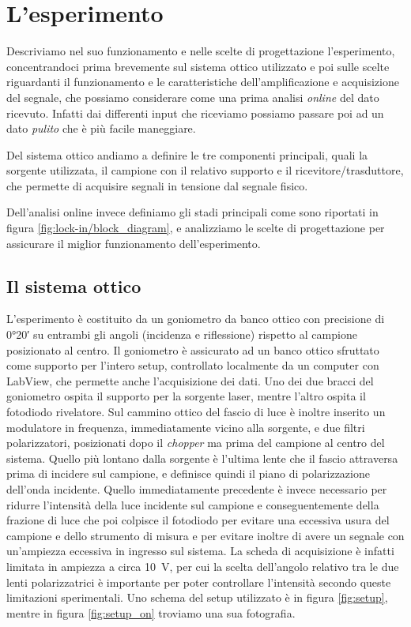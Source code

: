 \documentclass[
    prb,altaffilletter,citeautoscript,
    amsmath,amssymb,
    showpacs,showkeys,floatfix,
    reprint
]{revtex4-1}
\begin{document}
\section{L'esperimento}

Descriviamo nel suo funzionamento e nelle scelte di progettazione l'esperimento, concentrandoci prima brevemente sul sistema ottico utilizzato e poi sulle scelte riguardanti il funzionamento e le caratteristiche dell'amplificazione e acquisizione del segnale, che possiamo considerare come una prima analisi \emph{online} del dato ricevuto. Infatti dai differenti input che riceviamo possiamo passare poi ad un dato \emph{pulito} che è più facile maneggiare. 

Del sistema ottico andiamo a definire le tre componenti principali, quali la sorgente utilizzata, il campione con il relativo supporto e il ricevitore/trasduttore, che permette di acquisire segnali in tensione dal segnale fisico. 

Dell'analisi online invece definiamo gli stadi principali come sono riportati in figura \ref{fig:lock-in/block_diagram}, e analizziamo le scelte di progettazione per assicurare il miglior funzionamento dell'esperimento. 

\subsection{Il sistema ottico}

L'esperimento è costituito da un goniometro da banco ottico con precisione di \ang{0;20} su entrambi gli angoli (incidenza e riflessione) rispetto al campione posizionato al centro. Il goniometro è assicurato ad un banco ottico sfruttato come supporto per l'intero setup, controllato localmente da un computer con LabView, che permette anche l'acquisizione dei dati. Uno dei due bracci del goniometro ospita il supporto per la sorgente laser, mentre l'altro ospita il fotodiodo rivelatore. Sul cammino ottico del fascio di luce è inoltre inserito un modulatore in frequenza, immediatamente vicino alla sorgente, e due filtri polarizzatori, posizionati dopo il \emph{chopper} ma prima del campione al centro del sistema. Quello più lontano dalla sorgente è l'ultima lente che il fascio attraversa prima di incidere sul campione, e definisce quindi il piano di polarizzazione dell'onda incidente. Quello immediatamente precedente è invece necessario per ridurre l'intensità della luce incidente sul campione e conseguentemente della frazione di luce che poi colpisce il fotodiodo per evitare una eccessiva usura del campione e dello strumento di misura e per evitare inoltre di avere un segnale con un'ampiezza eccessiva in ingresso sul sistema. La scheda di acquisizione è infatti limitata in ampiezza a circa \SI{10}{\volt}, per cui la scelta dell'angolo relativo tra le due lenti polarizzatrici è importante per poter controllare l'intensità secondo queste limitazioni sperimentali. Uno schema del setup utilizzato è in figura \ref{fig:setup}, mentre in figura \ref{fig:setup_on} troviamo una sua fotografia. 
\end{document}
